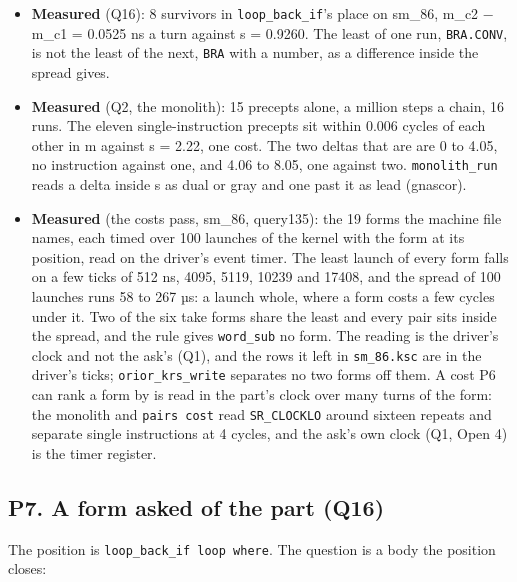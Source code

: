 \begin{itemize}
\item \textbf{Measured} (Q16): 8 survivors in \texttt{loop\_\allowbreak{}back\_\allowbreak{}if}'s place on sm\_\allowbreak{}86, m\_\allowbreak{}c2 − m\_\allowbreak{}c1 = 0.0525 ns a turn against s = 0.9260. The least of one run, \texttt{BRA.\allowbreak{}CONV}, is not the least of the next, \texttt{BRA} with a number, as a difference inside the spread gives.
\item \textbf{Measured} (Q2, the monolith): 15 precepts alone, a million steps a chain, 16 runs. The eleven single-instruction precepts sit within 0.006 cycles of each other in m against s = 2.22, one cost. The two deltas that are are 0 to 4.05, no instruction against one, and 4.06 to 8.05, one against two. \texttt{monolith\_\allowbreak{}run} reads a delta inside s as dual or gray and one past it as lead (gnascor).
\item \textbf{Measured} (the costs pass, sm\_\allowbreak{}86, query135): the 19 forms the machine file names, each timed over 100 launches of the kernel with the form at its position, read on the driver's event timer. The least launch of every form falls on a few ticks of 512 ns, 4095, 5119, 10239 and 17408, and the spread of 100 launches runs 58 to 267 µs: a launch whole, where a form costs a few cycles under it. Two of the six take forms share the least and every pair sits inside the spread, and the rule gives \texttt{word\_\allowbreak{}sub} no form. The reading is the driver's clock and not the ask's (Q1), and the rows it left in \texttt{sm\_\allowbreak{}86.\allowbreak{}ksc} are in the driver's ticks; \texttt{orior\_\allowbreak{}krs\_\allowbreak{}write} separates no two forms off them. A cost P6 can rank a form by is read in the part's clock over many turns of the form: the monolith and \texttt{pairs cost} read \texttt{SR\_\allowbreak{}CLOCKLO} around sixteen repeats and separate single instructions at 4 cycles, and the ask's own clock (Q1, Open 4) is the timer register.
\end{itemize}

\subsection{\texorpdfstring{P7. A form asked of the part (Q16)}{P7. A form asked of the part (Q16)}}

The position is \texttt{loop\_\allowbreak{}back\_\allowbreak{}if loop where}. The question is a body the position closes:

